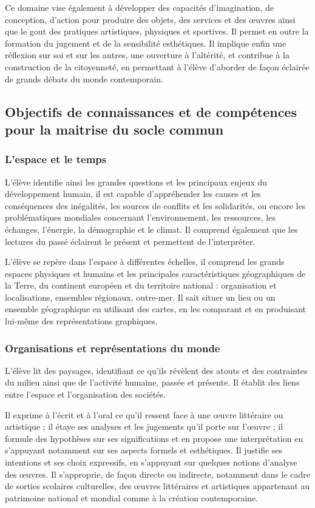 Ce domaine vise également à développer des capacités d’imagination, de conception, d’action pour produire des objets, des services et des œuvres ainsi que le gout des pratiques artistiques, physiques et sportives. Il permet en outre la formation du jugement et de la sensibilité esthétiques. Il implique enfin une réflexion sur soi et sur les autres, une ouverture à l’altérité, et contribue à la construction de la citoyenneté, en permettant à l’élève d’aborder de façon éclairée de grands débats du monde contemporain.
 
\subsection{Objectifs de connaissances et de compétences pour la maitrise du socle commun}
\subsubsection{L’espace et le temps}
L’élève identifie ainsi les grandes questions et les principaux enjeux du développement humain, il est capable d’appréhender les causes et les conséquences des inégalités, les sources de conflits et les solidarités, ou encore les problématiques mondiales concernant l’environnement, les ressources, les échanges, l’énergie, la démographie et le climat. Il comprend également que les lectures du passé éclairent le présent et permettent de l’interpréter.

L’élève se repère dans l’espace à différentes échelles, il comprend les grands espaces physiques et humains et les principales caractéristiques géographiques de la Terre, du continent européen et du territoire national : organisation et localisations, ensembles régionaux, outre-mer. Il sait situer un lieu ou un ensemble géographique en utilisant des cartes, en les comparant et en produisant lui-même des représentations graphiques.

\subsubsection{Organisations et représentations du monde}
L’élève lit des paysages, identifiant ce qu’ils révèlent des atouts et des contraintes du milieu ainsi que de l’activité humaine, passée et présente. Il établit des liens entre l’espace et l’organisation des sociétés.

Il exprime à l’écrit et à l’oral ce qu’il ressent face à une œuvre littéraire ou artistique ; il étaye ses analyses et les jugements qu’il porte sur l’œuvre ; il formule des hypothèses sur ses significations et en propose une interprétation en s’appuyant notamment sur ses aspects formels et esthétiques. Il justifie ses intentions et ses choix expressifs, en s’appuyant sur quelques notions d’analyse des œuvres. Il s’approprie, de façon directe ou indirecte, notamment dans le cadre de sorties scolaires culturelles, des œuvres littéraires et artistiques appartenant au patrimoine national et mondial comme à la création contemporaine.

